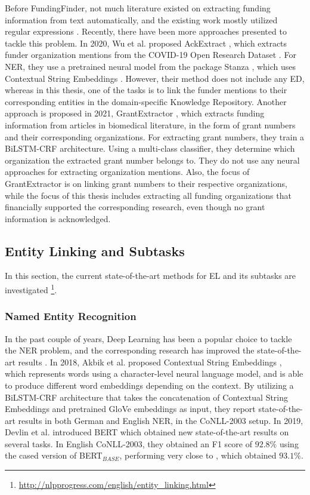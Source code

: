 \documentclass{report}
\theoremstyle{definition}
\theoremstyle{remark}
\begin{document}
    Before FundingFinder, not much literature existed on extracting funding information from text automatically, and the existing work mostly utilized regular expressions \cite{ElsPaper}. Recently, there have been more approaches presented to tackle this problem. In 2020, Wu et al. proposed AckExtract  \cite{AckExtract}, which extracts funder organization mentions from the COVID-19 Open Research Dataset \cite{CORD}. For NER, they use a pretrained neural model from the package Stanza \cite{stanza}, which uses Contextual String Embeddings \cite{flairpaper}. However, their method does not include any ED, whereas in this thesis, one of the tasks is to link the funder mentions to their corresponding entities in the domain-specific Knowledge Repository. Another approach is proposed in 2021, GrantExtractor \cite{GrantExtractor}, which extracts funding information from articles in biomedical literature, in the form of grant numbers and their corresponding organizations. For extracting grant numbers, they train a BiLSTM-CRF \cite{BiLSTMCRF} architecture. Using a multi-class classifier, they determine which organization the extracted grant number belongs to. They do not use any neural approaches for extracting organization mentions. Also, the focus of GrantExtractor is on linking grant numbers to their respective organizations, while the focus of this thesis includes extracting all funding organizations that financially supported the corresponding research, even though no grant information is acknowledged.

\subsection{Entity Linking and Subtasks}
\label{sota}
In this section, the current state-of-the-art methods for EL and its subtasks are investigated \footnote{\url{http://nlpprogress.com/english/entity_linking.html}}.
\subsubsection{Named Entity Recognition}
In the past couple of years, Deep Learning has been a popular choice to tackle the NER problem, and the corresponding research has improved the state-of-the-art results \cite{NERsurvey}. In 2018, Akbik et al. proposed Contextual String Embeddings \cite{flairpaper}, which represents words using a character-level neural language model, and is able to produce different word embeddings depending on the context. By utilizing a BiLSTM-CRF architecture that takes the concatenation of Contextual String Embeddings and pretrained GloVe embeddings \cite{glove} as input, they report state-of-the-art results in both German and English NER, in the CoNLL-2003 \cite{conll} setup. In 2019, Devlin et al. introduced BERT \cite{BERT} which obtained new state-of-the-art results on several tasks. In English CoNLL-2003, they obtained an F1 score of $92.8\%$ using the cased version of BERT$_{BASE}$\cite{BERT}, performing very close to \cite{flairpaper}, which obtained $93.1\%$.
\end{document}
